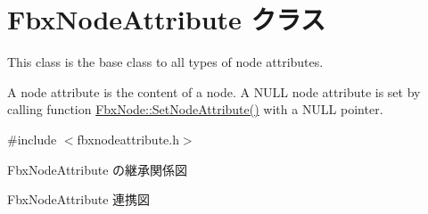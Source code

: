 \hypertarget{class_fbx_node_attribute}{}\section{Fbx\+Node\+Attribute クラス}
\label{class_fbx_node_attribute}


This class is the base class to all types of node attributes.

A node attribute is the content of a node. A {\ttfamily N\+U\+LL} node attribute is set by calling function \hyperlink{class_fbx_node_adb194a043dd1ccf3bc1e3bda520dc97a}{Fbx\+Node\+::\+Set\+Node\+Attribute()} with a {\ttfamily N\+U\+LL} pointer.  




{\ttfamily \#include $<$fbxnodeattribute.\+h$>$}



Fbx\+Node\+Attribute の継承関係図


Fbx\+Node\+Attribute 連携図
